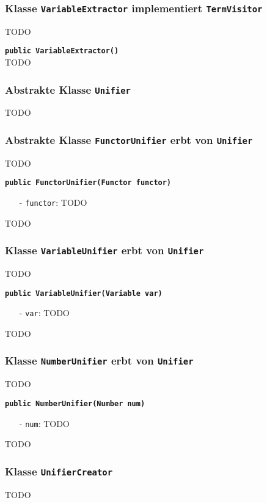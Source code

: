\documentclass[parskip=full,11pt,twoside]{scrartcl}
\begin{document}
\subsubsection{Klasse \texttt{VariableExtractor} implementiert \texttt{TermVisitor}}
TODO

\textbf{\texttt{public VariableExtractor()}}\\
TODO

\subsubsection{Abstrakte Klasse \texttt{Unifier}}
TODO

\subsubsection{Abstrakte Klasse \texttt{FunctorUnifier} erbt von \texttt{Unifier}}
TODO

\textbf{\texttt{public FunctorUnifier(Functor functor)}}
\begin{itemize}[noitemsep]
	\item[-] \texttt{functor}: TODO
\end{itemize}
TODO

\subsubsection{Klasse \texttt{VariableUnifier} erbt von \texttt{Unifier}}
TODO

\textbf{\texttt{public VariableUnifier(Variable var)}}
\begin{itemize}[noitemsep]
	\item[-] \texttt{var}: TODO
\end{itemize}
TODO

\subsubsection{Klasse \texttt{NumberUnifier} erbt von \texttt{Unifier}}
TODO

\textbf{\texttt{public NumberUnifier(Number num)}}
\begin{itemize}[noitemsep]
	\item[-] \texttt{num}: TODO
\end{itemize}
TODO

\subsubsection{Klasse \texttt{UnifierCreator}}
TODO
\end{document}
